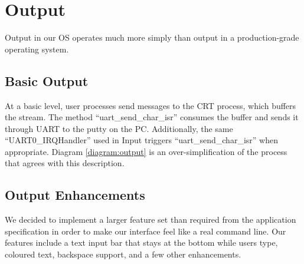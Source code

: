 \documentclass[12pt]{report}
\begin{document}
\section{Output}
    Output in our OS operates much more simply than output in a production-grade
    operating system.
\subsection{Basic Output}
    At a basic level, user processes send messages to the CRT process, which
    buffers the stream. The method ``uart\_send\_char\_isr'' consumes the buffer
    and sends it through UART to the putty on the PC. Additionally, the same
    ``UART0\_IRQHandler'' used in Input triggers ``uart\_send\_char\_isr'' when
    appropriate. Diagram \ref{diagram:output} is an over-simplification of the
    process that agrees with this description.


\subsection{Output Enhancements}
    We decided to implement a larger feature set than required from the
    application specification in order to make our interface feel like a real
    command line. Our features include a text input bar that stays at the bottom
    while users type, coloured text, backspace support, and a few other
    enhancements.
\end{document}
